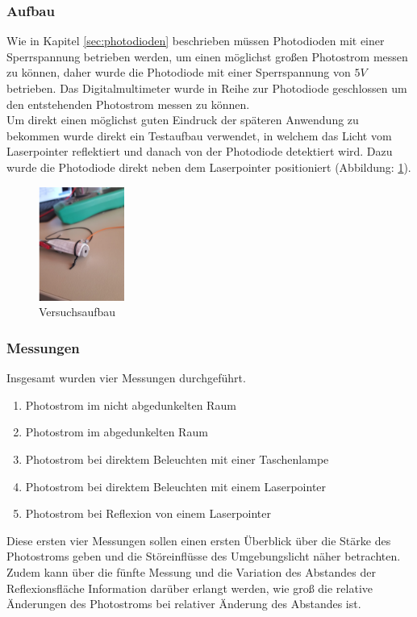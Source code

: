 \subsubsection{Aufbau}
Wie in Kapitel \ref{sec:photodioden} beschrieben müssen Photodioden mit einer Sperrspannung betrieben werden, um einen möglichst großen Photostrom messen zu können, daher wurde die Photodiode mit einer Sperrspannung von $5V$ betrieben. Das Digitalmultimeter wurde in Reihe zur Photodiode geschlossen um den entstehenden Photostrom messen zu können.\\
Um direkt einen möglichst guten Eindruck der späteren Anwendung zu bekommen wurde direkt ein Testaufbau verwendet, in welchem das Licht vom Laserpointer reflektiert und danach von der Photodiode detektiert wird. Dazu wurde die Photodiode direkt neben dem Laserpointer positioniert (Abbildung: \ref{versuch1_versuchsaufbau}). 
\begin{figure}[H]
	\centering
	\includegraphics[width=0.25\textwidth]{images/Machbarkeitsstudie/Versuch1_Aufbau}	
	\caption{Versuchsaufbau}
	\label{versuch1_versuchsaufbau}
\end{figure}
\subsubsection{Messungen}
Insgesamt wurden vier Messungen durchgeführt.
\begin{enumerate}
	\item Photostrom im nicht abgedunkelten Raum
	\item Photostrom im abgedunkelten Raum
	\item Photostrom bei direktem Beleuchten mit einer Taschenlampe
	\item Photostrom bei direktem Beleuchten mit einem Laserpointer
	\item Photostrom bei Reflexion von einem Laserpointer
\end{enumerate}
Diese ersten vier Messungen sollen einen ersten Überblick über die Stärke des Photostroms geben und die Störeinflüsse des Umgebungslicht näher betrachten. Zudem kann über die fünfte Messung und die Variation des Abstandes der Reflexionsfläche Information darüber erlangt werden, wie groß die relative Änderungen des Photostroms bei relativer Änderung des Abstandes ist.
